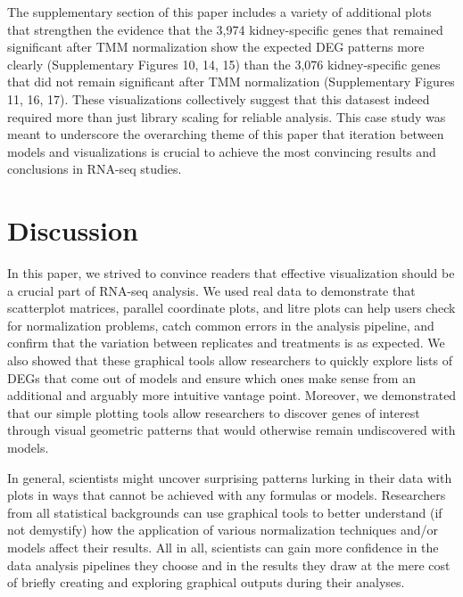 \documentclass{bioinfo}
\begin{document}
The supplementary section of this paper includes a variety of additional plots that strengthen the evidence that the 3,974 kidney-specific genes that remained significant after TMM normalization show the expected DEG patterns more clearly (Supplementary Figures 10, 14, 15) than the 3,076 kidney-specific genes that did not remain significant after TMM normalization (Supplementary Figures 11, 16, 17). These visualizations collectively suggest that this datasest indeed required more than just library scaling for reliable analysis. This case study was meant to underscore the overarching theme of this paper that iteration between models and visualizations is crucial to achieve the most convincing results and conclusions in RNA-seq studies.

\section{Discussion}

In this paper, we strived to convince readers that effective visualization should be a crucial part of RNA-seq analysis. We used real data to demonstrate that scatterplot matrices, parallel coordinate plots, and litre plots can help users check for normalization problems, catch common errors in the analysis pipeline, and confirm that the variation between replicates and treatments is as expected. We also showed that these graphical tools allow researchers to quickly explore lists of DEGs that come out of models and ensure which ones make sense from an additional and arguably more intuitive vantage point. Moreover, we demonstrated that our simple plotting tools allow researchers to discover genes of interest through visual geometric patterns that would otherwise remain undiscovered with models.

In general, scientists might uncover surprising patterns lurking in their data with plots in ways that cannot be achieved with any formulas or models. Researchers from all statistical backgrounds can use graphical tools to better understand (if not demystify) how the application of various normalization techniques and/or models affect their results. All in all, scientists can gain more confidence in the data analysis pipelines they choose and in the results they draw at the mere cost of briefly creating and exploring graphical outputs during their analyses.
\end{document}
